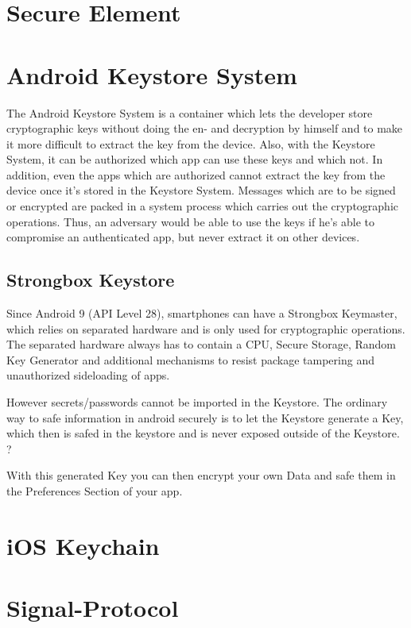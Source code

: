 \documentclass[12pt,twoside,a4paper,parskip]{scrbook}
\begin{document}
\section{Secure Element}

\section{Android Keystore System}

The Android Keystore System is a container which lets the developer store cryptographic keys without doing the en- and decryption by himself and to make it more difficult to extract the key from the device. Also, with the Keystore System, it can be authorized which app can use these keys and which not. In addition, even the apps which are authorized cannot extract the key from the device once it's stored in the Keystore System. Messages which are to be signed or encrypted are packed in a system process which carries out the cryptographic operations. Thus, an adversary would be able to use the keys if he's able to compromise an authenticated app, but never extract it on other devices.

\subsection{Strongbox Keystore}

Since Android 9 (API Level 28), smartphones can have a Strongbox Keymaster, which relies on separated hardware and is only used for cryptographic operations.
The separated hardware always has to contain a CPU, Secure Storage, Random Key Generator and additional mechanisms to resist package tampering and unauthorized sideloading of apps.

However secrets/passwords cannot be imported in the Keystore. The ordinary way to safe information in android securely is to let the Keystore generate a Key, which then 
is safed in the keystore and is never exposed outside of the Keystore. ? 

With this generated Key you can then encrypt your own Data and safe them in the Preferences Section of your app.

\section{iOS Keychain}


\section{Signal-Protocol}
\end{document}
